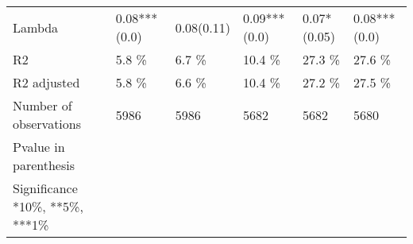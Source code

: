\begin{tabular}{llllll}
Lambda                          &   0.08***(0.0) &     0.08(0.11) &   0.09***(0.0) &    0.07*(0.05) &   0.08***(0.0) \\
R2                              &          5.8 \% &          6.7 \% &         10.4 \% &         27.3 \% &         27.6 \% \\
R2 adjusted                     &          5.8 \% &          6.6 \% &         10.4 \% &         27.2 \% &         27.5 \% \\
Number of observations          &           5986 &           5986 &           5682 &           5682 &           5680 \\
Pvalue in parenthesis           &                &                &                &                &                \\
Significance *10\%, **5\%, ***1\%  &                &                &                &                &                \\
\bottomrule
\end{tabular}
